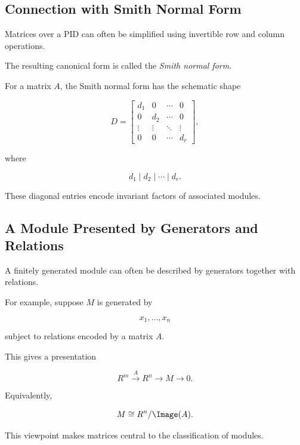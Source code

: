 \subsection{Connection with Smith Normal Form}
\label{subsec:smith-normal-form-modules}

Matrices over a PID can often be simplified using invertible row and column
operations.

The resulting canonical form is called the \emph{Smith normal form}.

For a matrix \(A\), the Smith normal form has the schematic shape

\[
D=
\begin{bmatrix}
d_1 & 0 & \cdots & 0\\
0 & d_2 & \cdots & 0\\
\vdots & \vdots & \ddots & \vdots\\
0 & 0 & \cdots & d_r
\end{bmatrix},
\]

where

\[ d_1\mid d_2\mid\cdots\mid d_r. \]

These diagonal entries encode invariant factors of associated modules.

\subsection{A Module Presented by Generators and Relations}
\label{subsec:module-presentations}

A finitely generated module can often be described by generators together
with relations.

For example, suppose \(M\) is generated by

\[ x_1,\ldots,x_n \]

subject to relations encoded by a matrix \(A\).

This gives a presentation

\[ R^m\xrightarrow{A}R^n\longrightarrow M\longrightarrow0. \]

Equivalently,

\[ M\cong R^n/\Image(A). \]

This viewpoint makes matrices central to the classification of modules.

